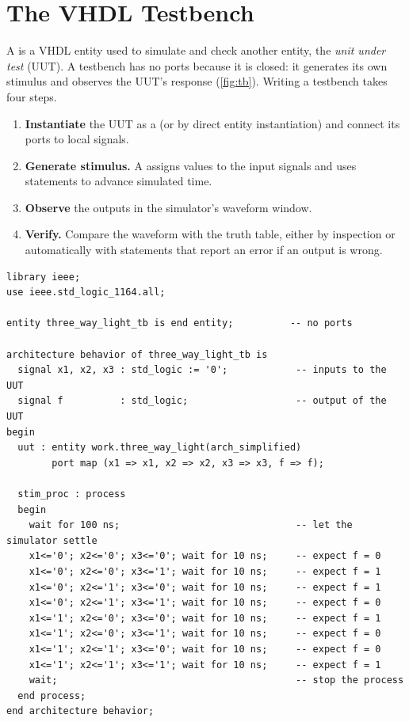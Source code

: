 \section{The VHDL Testbench}\label{sec:testbench}
A  is a VHDL entity used to simulate and check another entity, the \emph{unit under test} (UUT). A testbench has no ports because it is closed: it generates its own stimulus and observes the UUT's response (\cref{fig:tb}). Writing a testbench takes four steps.
\begin{enumerate}
  \item \textbf{Instantiate} the UUT as a  (or by direct entity instantiation) and connect its ports to local signals.
  \item \textbf{Generate stimulus.} A  assigns values to the input signals and uses  statements to advance simulated time.
  \item \textbf{Observe} the outputs in the simulator's waveform window.
  \item \textbf{Verify.} Compare the waveform with the truth table, either by inspection or automatically with  statements that report an error if an output is wrong.
\end{enumerate}


\begin{lstlisting}[caption={A testbench for the three-way light that applies all eight input combinations.},label={lst:tb}]
library ieee;
use ieee.std_logic_1164.all;

entity three_way_light_tb is end entity;          -- no ports

architecture behavior of three_way_light_tb is
  signal x1, x2, x3 : std_logic := '0';            -- inputs to the UUT
  signal f          : std_logic;                   -- output of the UUT
begin
  uut : entity work.three_way_light(arch_simplified)
        port map (x1 => x1, x2 => x2, x3 => x3, f => f);

  stim_proc : process
  begin
    wait for 100 ns;                               -- let the simulator settle
    x1<='0'; x2<='0'; x3<='0'; wait for 10 ns;     -- expect f = 0
    x1<='0'; x2<='0'; x3<='1'; wait for 10 ns;     -- expect f = 1
    x1<='0'; x2<='1'; x3<='0'; wait for 10 ns;     -- expect f = 1
    x1<='0'; x2<='1'; x3<='1'; wait for 10 ns;     -- expect f = 0
    x1<='1'; x2<='0'; x3<='0'; wait for 10 ns;     -- expect f = 1
    x1<='1'; x2<='0'; x3<='1'; wait for 10 ns;     -- expect f = 0
    x1<='1'; x2<='1'; x3<='0'; wait for 10 ns;     -- expect f = 0
    x1<='1'; x2<='1'; x3<='1'; wait for 10 ns;     -- expect f = 1
    wait;                                          -- stop the process
  end process;
end architecture behavior;
\end{lstlisting}

